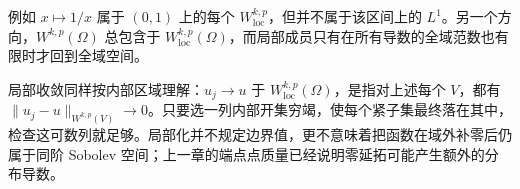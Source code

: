\ProseParagraphBreak

例如 \(x\mapsto1/x\) 属于 \((0,1)\) 上的每个 \(W^{k,p}_{\mathrm{loc}}\)，但并不属于该区间上的 \(L^1\)。另一个方向，\(W^{k,p}(\Omega)\) 总包含于 \(W^{k,p}_{\mathrm{loc}}(\Omega)\)，而局部成员只有在所有导数的全域范数也有限时才回到全域空间。

\ProseParagraphBreak

局部收敛同样按内部区域理解：\(u_j\to u\) 于 \(W^{k,p}_{\mathrm{loc}}(\Omega)\)，是指对上述每个 \(V\)，都有 \(\|u_j-u\|_{W^{k,p}(V)}\to0\)。只要选一列内部开集穷竭，使每个紧子集最终落在其中，检查这可数列就足够。局部化并不规定边界值，更不意味着把函数在域外补零后仍属于同阶 Sobolev 空间；上一章的端点点质量已经说明零延拓可能产生额外的分布导数。
